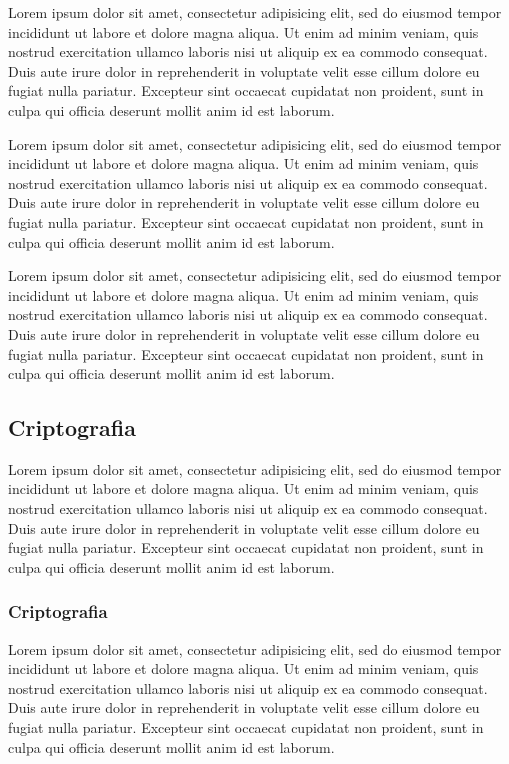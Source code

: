 \documentclass[
	12pt,				%
	twoside,			%
	a4paper,			%
	chapter=TITLE,		%
	english,			%
	brazil				%
	]{tcc}
\begin{document}
	Lorem ipsum dolor sit amet, consectetur adipisicing elit, sed do eiusmod
	tempor incididunt ut labore et dolore magna aliqua. Ut enim ad minim veniam,
	quis nostrud exercitation ullamco laboris nisi ut aliquip ex ea commodo
	consequat. Duis aute irure dolor in reprehenderit in voluptate velit esse
	cillum dolore eu fugiat nulla pariatur. Excepteur sint occaecat cupidatat non
	proident, sunt in culpa qui officia deserunt mollit anim id est laborum.

	Lorem ipsum dolor sit amet, consectetur adipisicing elit, sed do eiusmod
	tempor incididunt ut labore et dolore magna aliqua. Ut enim ad minim veniam,
	quis nostrud exercitation ullamco laboris nisi ut aliquip ex ea commodo
	consequat. Duis aute irure dolor in reprehenderit in voluptate velit esse
	cillum dolore eu fugiat nulla pariatur. Excepteur sint occaecat cupidatat non
	proident, sunt in culpa qui officia deserunt mollit anim id est laborum.

	Lorem ipsum dolor sit amet, consectetur adipisicing elit, sed do eiusmod
	tempor incididunt ut labore et dolore magna aliqua. Ut enim ad minim veniam,
	quis nostrud exercitation ullamco laboris nisi ut aliquip ex ea commodo
	consequat. Duis aute irure dolor in reprehenderit in voluptate velit esse
	cillum dolore eu fugiat nulla pariatur. Excepteur sint occaecat cupidatat non
	proident, sunt in culpa qui officia deserunt mollit anim id est laborum.

	\subsection{Criptografia}

	Lorem ipsum dolor sit amet, consectetur adipisicing elit, sed do eiusmod
	tempor incididunt ut labore et dolore magna aliqua. Ut enim ad minim veniam,
	quis nostrud exercitation ullamco laboris nisi ut aliquip ex ea commodo
	consequat. Duis aute irure dolor in reprehenderit in voluptate velit esse
	cillum dolore eu fugiat nulla pariatur. Excepteur sint occaecat cupidatat non
	proident, sunt in culpa qui officia deserunt mollit anim id est laborum.

	\subsubsection{Criptografia}

	Lorem ipsum dolor sit amet, consectetur adipisicing elit, sed do eiusmod
	tempor incididunt ut labore et dolore magna aliqua. Ut enim ad minim veniam,
	quis nostrud exercitation ullamco laboris nisi ut aliquip ex ea commodo
	consequat. Duis aute irure dolor in reprehenderit in voluptate velit esse
	cillum dolore eu fugiat nulla pariatur. Excepteur sint occaecat cupidatat non
	proident, sunt in culpa qui officia deserunt mollit anim id est laborum.
\end{document}
